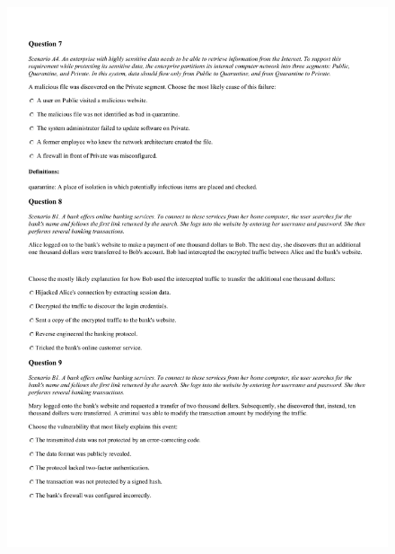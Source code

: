 \begin{figure}[!h]
    \begin{center}
    \advance\leftskip-3cm
    \advance\rightskip-3cm
    \includegraphics[scale=.25]{images/exam/correctly_formated_exam-04.jpg}
    \label{fig:correctly_formated_exam-04}
\end{center}
\end{figure}

